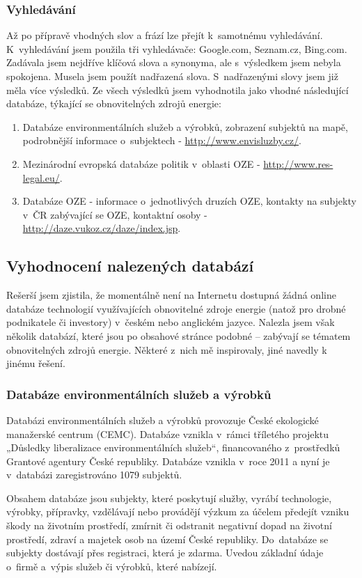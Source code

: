 \documentclass[11pt,a4paper]{article}
\begin{document}
\subsubsection{Vyhledávání}
Až po přípravě vhodných slov a frází lze přejít k~samotnému vyhledávání. K~vyhledávání jsem použila tři vyhledávače: Google.com, Seznam.cz, Bing.com. Zadávala jsem nejdříve klíčová slova a synonyma, ale s~výsledkem jsem nebyla spokojena. Musela jsem použít nadřazená slova. S~nadřazenými slovy jsem již měla více výsledků.  Ze všech výsledků jsem vyhodnotila jako vhodné následující databáze, týkající se obnovitelných zdrojů energie: 
\begin{enumerate}
\item Databáze environmentálních služeb a výrobků, zobrazení subjektů na mapě, podrobnější informace o~subjektech - \url{http://www.envisluzby.cz/}. 
\item Mezinárodní evropská databáze politik v~oblasti OZE - \url{http://www.res-legal.eu/}.
\item Databáze OZE - informace o~jednotlivých druzích OZE, kontakty na subjekty v~ČR zabývající se OZE, kontaktní osoby - \url{http://daze.vukoz.cz/daze/index.jsp}.
\end{enumerate}

\subsection{Vyhodnocení nalezených databází}
Rešerší jsem zjistila, že momentálně není na Internetu dostupná žádná online databáze technologií využívajících obnovitelné zdroje energie (natož pro drobné podnikatele či investory) v~českém nebo anglickém jazyce. Nalezla jsem však několik databází, které jsou po obsahové stránce podobné – zabývají se tématem obnovitelných zdrojů energie. Některé z~nich mě inspirovaly, jiné navedly k jinému řešení.

\subsubsection{Databáze environmentálních služeb a výrobků}
Databázi environmentálních služeb a výrobků provozuje České ekologické manažerské centrum (CEMC).  Databáze vznikla v~rámci tříletého projektu „Důsledky liberalizace environmentálních služeb“, financovaného z~prostředků Grantové agentury České republiky. Databáze vznikla v~roce 2011 a nyní je v~databázi zaregistrováno 1079 subjektů.

Obsahem databáze jsou subjekty, které poskytují služby, vyrábí technologie, výrobky, přípravky, vzdělávají nebo provádějí výzkum za účelem předejít vzniku škody na životním prostředí, zmírnit či odstranit negativní dopad na životní prostředí, zdraví a majetek osob na území České republiky. Do~databáze se subjekty dostávají přes registraci, která je zdarma. Uvedou základní údaje o~firmě a~výpis služeb či výrobků, které nabízejí. 
\end{document}

